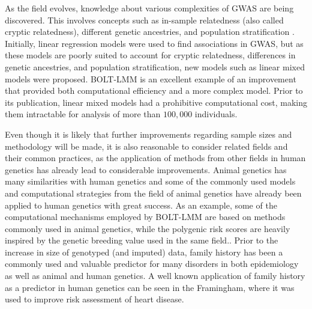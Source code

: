 As the field evolves, knowledge about various complexities of GWAS are being discovered. This involves concepts such as in-sample relatedness (also called cryptic relatedness), different genetic ancestries, and population stratification \cite{genome2014whole,zeng2015statistical} . Initially, linear regression models were used to find associations in GWAS, but as these models are poorly suited to account for cryptic relatedness, differences in genetic ancestries, and population stratification, new models such as linear mixed models were proposed. BOLT-LMM\cite{loh2015efficient} is an excellent example of an improvement that provided both computational efficiency and a more complex model. Prior to its publication, linear mixed models had a prohibitive computational cost, making them intractable for analysis of more than $ 100,000 $ individuals.

Even though it is likely that further improvements regarding sample sizes and methodology will be made, it is also reasonable to consider related fields and their common practices, as the application of methods from other fields in human genetics has already lead to considerable improvements. Animal genetics has many similarities with human genetics and some of the commonly used models and computational strategies from the field of animal genetics have already been applied to human genetics with great success. As an example, some of the computational mechanisms employed by BOLT-LMM are based on methods commonly used in animal genetics, while the polygenic risk scores are heavily inspired by the genetic breeding value used in the same field.\cite{loh2015efficient,wray2019complex,meuwissen2001prediction}. Prior to the increase in size of genotyped (and imputed) data, family history has been a commonly used and valuable predictor for many disorders in both epidemiology as well as animal and human genetics\cite{guttmacher2004family,runeson2003family,collaborative2001familial,johns2001systematic}. A well known application of family history as a predictor in human genetics can be seen in the Framingham, where it was used to improve risk assessment of heart disease\cite{kannel1990contribution,splansky2007third}.


